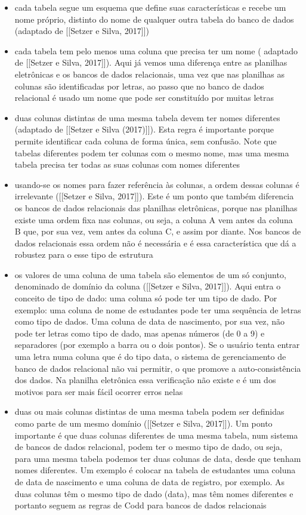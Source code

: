 \begin{itemize}
\item cada tabela segue um esquema que define suas características e recebe um nome próprio, distinto do nome de qualquer outra tabela do banco de dados (adaptado de [[Setzer e Silva, 2017]])
\item cada tabela tem pelo menos uma coluna que precisa ter um nome ( adaptado de [[Setzer e Silva, 2017]]). Aqui já vemos uma diferença entre as planilhas eletrônicas e os bancos de dados relacionais, uma vez que nas planilhas as colunas são identificadas por letras, ao passo que no banco de dados relacional é usado um nome que pode ser constituído por muitas letras
\item duas colunas distintas de uma mesma tabela devem ter nomes diferentes (adaptado de [[Setzer e Silva (2017)]]). Esta regra é importante porque permite identificar cada coluna de forma única, sem confusão. Note que tabelas diferentes podem ter colunas com o mesmo nome, mas uma mesma tabela precisa ter todas as suas colunas com nomes diferentes
\item usando-se os nomes para fazer referência às colunas, a ordem dessas colunas é irrelevante  ([[Setzer e Silva, 2017]]). Este é um ponto que também diferencia os bancos de dados relacionais das planilhas eletrônicas, porque nas planilhas existe uma ordem fixa nas colunas, ou seja, a coluna A vem antes da coluna B que, por sua vez, vem antes da coluna C, e assim por diante. Nos bancos de dados relacionais essa ordem não é necessária e é essa característica que dá a robustez para o esse tipo de estrutura
\item os valores de uma coluna de uma tabela são elementos de um só conjunto, denominado de domínio da coluna  ([[Setzer e Silva, 2017]]). Aqui entra o conceito de tipo de dado: uma coluna só pode ter um tipo de dado. Por exemplo: uma coluna de nome de estudantes pode ter uma sequência de letras como tipo de dados. Uma coluna de data de nascimento, por sua vez, não pode ter letras como tipo de dado, mas apenas números (de 0 a 9) e separadores (por exemplo a barra ou o dois pontos). Se o usuário tenta entrar uma letra numa coluna que é do tipo data, o sistema de gerenciamento de banco de dados relacional não vai permitir, o que promove a auto-consistência dos dados. Na planilha eletrônica essa verificação não existe e é um dos motivos para ser mais fácil ocorrer erros nelas
\item duas ou mais colunas distintas de uma mesma tabela podem ser definidas como parte de um mesmo domínio  ([[Setzer e Silva, 2017]]). Um ponto importante é que duas colunas diferentes de uma mesma tabela, num sistema de bancos de dados relacional, podem ter o mesmo tipo de dado, ou seja, para uma mesma tabela podemos ter duas colunas de data, desde que tenham nomes diferentes. Um exemplo é colocar na tabela de estudantes uma coluna de data de nascimento e uma coluna de data de registro, por exemplo. As duas colunas têm o mesmo tipo de dado (data), mas têm nomes diferentes e portanto seguem as regras de Codd para bancos de dados relacionais

\end{itemize}
